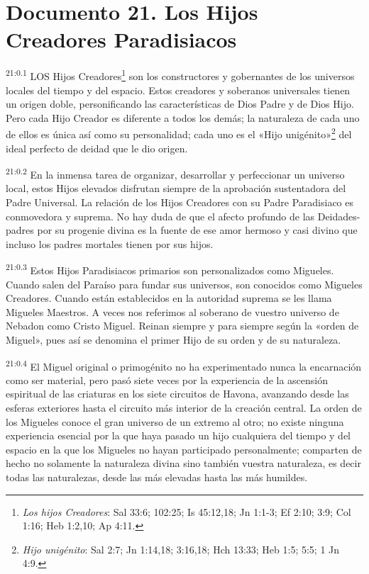 \chapter{Documento 21. Los Hijos Creadores Paradisiacos}
\par
\textsuperscript{21:0.1} LOS Hijos Creadores\footnote{\textit{Los hijos Creadores}: Sal 33:6; 102:25; Is 45:12,18; Jn 1:1-3; Ef 2:10; 3:9; Col 1:16; Heb 1:2,10; Ap 4:11.} son los constructores y gobernantes de los universos locales del tiempo y del espacio. Estos creadores y soberanos universales tienen un origen doble, personificando las características de Dios Padre y de Dios Hijo. Pero cada Hijo Creador es diferente a todos los demás; la naturaleza de cada uno de ellos es única así como su personalidad; cada uno es el «Hijo unigénito»\footnote{\textit{Hijo unigénito}: Sal 2:7; Jn 1:14,18; 3:16,18; Hch 13:33; Heb 1:5; 5:5; 1 Jn 4:9.} del ideal perfecto de deidad que le dio origen.

\par
\textsuperscript{21:0.2} En la inmensa tarea de organizar, desarrollar y perfeccionar un universo local, estos Hijos elevados disfrutan siempre de la aprobación sustentadora del Padre Universal. La relación de los Hijos Creadores con su Padre Paradisiaco es conmovedora y suprema. No hay duda de que el afecto profundo de las Deidades-padres por su progenie divina es la fuente de ese amor hermoso y casi divino que incluso los padres mortales tienen por sus hijos.

\par
\textsuperscript{21:0.3} Estos Hijos Paradisiacos primarios son personalizados como Migueles. Cuando salen del Paraíso para fundar sus universos, son conocidos como Migueles Creadores. Cuando están establecidos en la autoridad suprema se les llama Migueles Maestros. A veces nos referimos al soberano de vuestro universo de Nebadon como Cristo Miguel. Reinan siempre y para siempre según la «orden de Miguel», pues así se denomina el primer Hijo de su orden y de su naturaleza.

\par
\textsuperscript{21:0.4} El Miguel original o primogénito no ha experimentado nunca la encarnación como ser material, pero pasó siete veces por la experiencia de la ascensión espiritual de las criaturas en los siete circuitos de Havona, avanzando desde las esferas exteriores hasta el circuito más interior de la creación central. La orden de los Migueles conoce el gran universo de un extremo al otro; no existe ninguna experiencia esencial por la que haya pasado un hijo cualquiera del tiempo y del espacio en la que los Migueles no hayan participado personalmente; comparten de hecho no solamente la naturaleza divina sino también vuestra naturaleza, es decir todas las naturalezas, desde las más elevadas hasta las más humildes.

